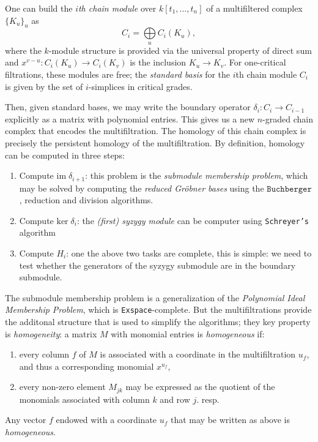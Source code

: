 \documentclass[a4paper,8pt,epsfig]{article}
\begin{document}
 	 One can build the {\it $i$th chain module} over $k[t_1, ..., t_n]$ of a multifiltered complex $\{K_u\}_u$ as
 	 \[
 	 	C_i = \bigoplus\limits_u C_i(K_u),
 	 \]
 	 where the $k$-module structure is provided via the universal property of direct sum and $x^{v-u}: C_i(K_u) \to C_i(K_v)$ is the inclusion $K_u \to K_v$. For one-critical filtrations, these modules are free; the {\it standard basis} for the $i$th chain module $C_i$ is given by the set of $i$-simplices in critical grades.
 	 
 	 Then, given standard bases, we may write the boundary operator $\delta_i: C_i \to C_{i-1}$ explicitly as a matrix with polynomial entries. This gives us a new $n$-graded chain complex that encodes the multifiltration. The homology of this chain complex is precisely the persistent homology of the multifiltration. By definition, homology can be computed in three steps:
 	 \begin{enumerate}
 	 	\item Compute $\mathrm{im}\; \delta_{i+1}$: this problem is the {\it submodule membership problem}, which may be solved by computing the {\it reduced Gröbner bases} using the $\texttt{Buchberger}$, reduction and division algorithms.
 	 	\item Compute $\mathrm{ker}\; \delta_i$: the {\it (first) syzygy module} can be computer using \texttt{Schreyer's} algorithm
 	 	\item Compute $H_i$: one the above two tasks are complete, this is simple: we need to test whether the generators of the syzygy submodule are in the boundary submodule.
 	 \end{enumerate}
 	 
 	 The submodule membership problem is a generalization of the {\it Polynomial Ideal Membership Problem}, which is \texttt{Exspace}-complete. But the multifiltrations provide the additonal structure that is used to simplify the algorithms; they key property is {\it homogeneity}: a matrix $M$ with monomial entries is {\it homogeneous} if:
 	 \begin{enumerate}
 	 	\item every column $f$ of $M$ is associated with a coordinate in the multifiltration $u_f$, and thus a corresponding monomial $x^{u_f}$,
 	 	\item every non-zero element $M_{jk}$ may be expressed as the quotient of the monomials associated with column $k$ and row $j$. resp.
 	 \end{enumerate}
  	Any vector $f$ endowed with a coordinate $u_f$ that may be written as above is {\it homogeneous}.
  	
\end{document}
